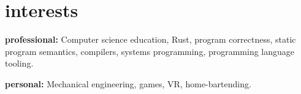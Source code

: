 \documentclass[]{cv-style}          %
\renewenvironment{entrylist}{%
  \begin{itemize}[leftmargin=1in]%
}{%
  \end{itemize}
}
\renewcommand{\entry}[4]{%
  \item[#1]
    \textbf{#2}%
    \hfill%
    {\footnotesize\addfontfeature{Color=lightgray} #3}\\%
    #4\vspace{\parsep}%
  }
\begin{document}
%
% 
%
%



\section{interests}
  \vspace{-0.2cm}

\textbf{professional:} Computer science education, Rust, program correctness, static program semantics, compilers, systems programming, programming language tooling.

\textbf{personal:} Mechanical engineering, games, VR, home-bartending.

\end{document}
